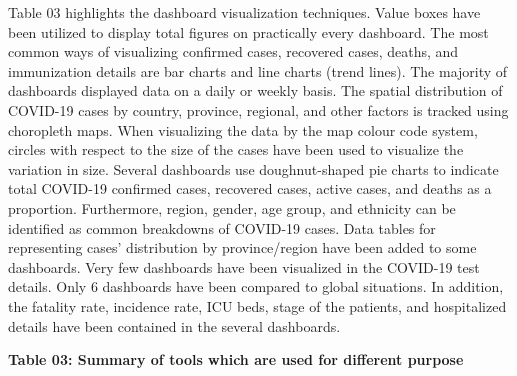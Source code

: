 \documentclass[
]{article}
\begin{document}
Table 03 highlights the dashboard visualization techniques. Value boxes
have been utilized to display total figures on practically every
dashboard. The most common ways of visualizing confirmed cases,
recovered cases, deaths, and immunization details are bar charts and
line charts (trend lines). The majority of dashboards displayed data on
a daily or weekly basis. The spatial distribution of COVID-19 cases by
country, province, regional, and other factors is tracked using
choropleth maps. When visualizing the data by the map colour code
system, circles with respect to the size of the cases have been used to
visualize the variation in size. Several dashboards use doughnut-shaped
pie charts to indicate total COVID-19 confirmed cases, recovered cases,
active cases, and deaths as a proportion. Furthermore, region, gender,
age group, and ethnicity can be identified as common breakdowns of
COVID-19 cases. Data tables for representing cases' distribution by
province/region have been added to some dashboards. Very few dashboards
have been visualized in the COVID-19 test details. Only 6 dashboards
have been compared to global situations. In addition, the fatality rate,
incidence rate, ICU beds, stage of the patients, and hospitalized
details have been contained in the several dashboards.\hfill\break

\textbf{Table 03: Summary of tools which are used for different purpose}
\end{document}
